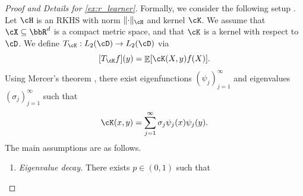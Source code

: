 \documentclass[11pt]{article} %
\newcommand{\pref}[1]{\cref{#1}}
\theoremstyle{theorem}  %
\theoremstyle{plain}
\DeclarePairedDelimiter{\abs}{\lvert}{\rvert} %
\DeclarePairedDelimiter{\brk}{[}{]}
\DeclarePairedDelimiter{\nrm}{\|}{\|}
\DeclareMathOperator{\En}{\mathbb{E}}
\newcommand{\ls}{\ell}
\newcommand{\ldef}{\vcentcolon=}
\newcommand{\Tk}{T_{\cK}}
\newcommand{\nuisance}{\cG}
\newcommand{\target}{\Theta}
\begin{document}
\begin{proof}[Proof and Details for \pref{ex:r_learner}]%

%
Formally, we consider the following setup \citep{nie2017quasi}. Let $\cH$ is an RKHS with norm $\nrm{\cdot}_{\cH}$ and kernel $\cK$. We assume that $\cX\subseteq\bbR^{d}$ is a compact metric space, and that $\cK$ is a kernel with respect to $\cD$. We define $T_{\cK}:L_2(\cD)\to{}L_2(\cD)$ via
\[
  \brk{\Tk{}f}(y) = \En\brk{\cK(X,y)f(X)}.
\]
Using Mercer's theorem \citep{cucker2002mathematical}, there exist eigenfunctions $(\psi_j)_{j=1}^{\infty}$ and eigenvalues $(\sigma_j)_{j=1}^{\infty}$ such that
\[
\cK(x,y) = \sum_{j=1}^{\infty}\sigma_j\psi_j(x)\psi_j(y).
\]
The main assumptions are as follows.
\begin{enumerate}
\item \emph{Eigenvalue decay.} There exists $p\in{}(0,1)$ such that

\end{enumerate}
\end{proof}
\end{document}
